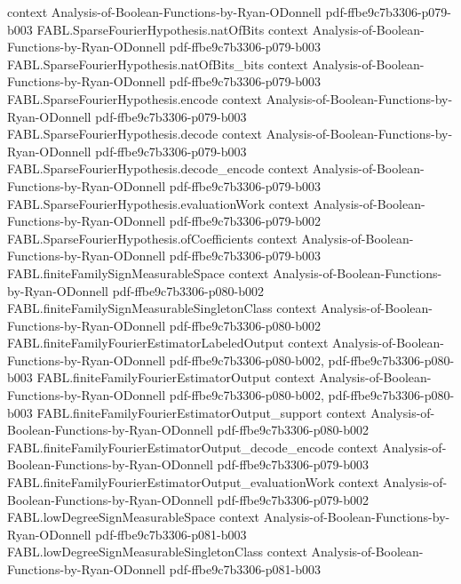 \begin{theorem}
  {context}
  {Analysis-of-Boolean-Functions-by-Ryan-ODonnell}
  {pdf-ffbe9c7b3306-p079-b003}
\proofstep
  {FABL.SparseFourierHypothesis.natOfBits}
  {context}
  {Analysis-of-Boolean-Functions-by-Ryan-ODonnell}
  {pdf-ffbe9c7b3306-p079-b003}
\proofstep
  {FABL.SparseFourierHypothesis.natOfBits_bits}
  {context}
  {Analysis-of-Boolean-Functions-by-Ryan-ODonnell}
  {pdf-ffbe9c7b3306-p079-b003}
\proofstep
  {FABL.SparseFourierHypothesis.encode}
  {context}
  {Analysis-of-Boolean-Functions-by-Ryan-ODonnell}
  {pdf-ffbe9c7b3306-p079-b003}
\proofstep
  {FABL.SparseFourierHypothesis.decode}
  {context}
  {Analysis-of-Boolean-Functions-by-Ryan-ODonnell}
  {pdf-ffbe9c7b3306-p079-b003}
\proofstep
  {FABL.SparseFourierHypothesis.decode_encode}
  {context}
  {Analysis-of-Boolean-Functions-by-Ryan-ODonnell}
  {pdf-ffbe9c7b3306-p079-b003}
\proofstep
  {FABL.SparseFourierHypothesis.evaluationWork}
  {context}
  {Analysis-of-Boolean-Functions-by-Ryan-ODonnell}
  {pdf-ffbe9c7b3306-p079-b002}
\proofstep
  {FABL.SparseFourierHypothesis.ofCoefficients}
  {context}
  {Analysis-of-Boolean-Functions-by-Ryan-ODonnell}
  {pdf-ffbe9c7b3306-p079-b003}
\proofstep
  {FABL.finiteFamilySignMeasurableSpace}
  {context}
  {Analysis-of-Boolean-Functions-by-Ryan-ODonnell}
  {pdf-ffbe9c7b3306-p080-b002}
\proofstep
  {FABL.finiteFamilySignMeasurableSingletonClass}
  {context}
  {Analysis-of-Boolean-Functions-by-Ryan-ODonnell}
  {pdf-ffbe9c7b3306-p080-b002}
\proofstep
  {FABL.finiteFamilyFourierEstimatorLabeledOutput}
  {context}
  {Analysis-of-Boolean-Functions-by-Ryan-ODonnell}
  {pdf-ffbe9c7b3306-p080-b002,
    pdf-ffbe9c7b3306-p080-b003}
\proofstep
  {FABL.finiteFamilyFourierEstimatorOutput}
  {context}
  {Analysis-of-Boolean-Functions-by-Ryan-ODonnell}
  {pdf-ffbe9c7b3306-p080-b002,
    pdf-ffbe9c7b3306-p080-b003}
\proofstep
  {FABL.finiteFamilyFourierEstimatorOutput_support}
  {context}
  {Analysis-of-Boolean-Functions-by-Ryan-ODonnell}
  {pdf-ffbe9c7b3306-p080-b002}
\proofstep
  {FABL.finiteFamilyFourierEstimatorOutput_decode_encode}
  {context}
  {Analysis-of-Boolean-Functions-by-Ryan-ODonnell}
  {pdf-ffbe9c7b3306-p079-b003}
\proofstep
  {FABL.finiteFamilyFourierEstimatorOutput_evaluationWork}
  {context}
  {Analysis-of-Boolean-Functions-by-Ryan-ODonnell}
  {pdf-ffbe9c7b3306-p079-b002}
\proofstep
  {FABL.lowDegreeSignMeasurableSpace}
  {context}
  {Analysis-of-Boolean-Functions-by-Ryan-ODonnell}
  {pdf-ffbe9c7b3306-p081-b003}
\proofstep
  {FABL.lowDegreeSignMeasurableSingletonClass}
  {context}
  {Analysis-of-Boolean-Functions-by-Ryan-ODonnell}
  {pdf-ffbe9c7b3306-p081-b003}
\proofstep

\end{theorem}
